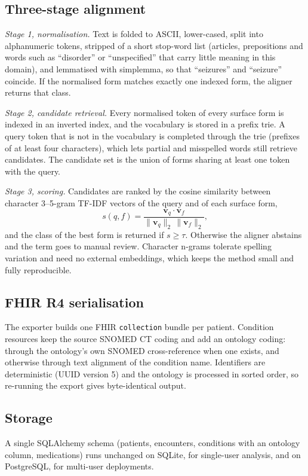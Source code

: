 \documentclass[preprint,12pt]{elsarticle}
\begin{document}
\subsection{Three-stage alignment}
\textit{Stage 1, normalisation.} Text is folded to ASCII, lower-cased, split into alphanumeric tokens, stripped of a short stop-word list (articles, prepositions and words such as ``disorder'' or ``unspecified'' that carry little meaning in this domain), and lemmatised with simplemma, so that ``seizures'' and ``seizure'' coincide. If the normalised form matches exactly one indexed form, the aligner returns that class.

\textit{Stage 2, candidate retrieval.} Every normalised token of every surface form is indexed in an inverted index, and the vocabulary is stored in a prefix trie. A query token that is not in the vocabulary is completed through the trie (prefixes of at least four characters), which lets partial and misspelled words still retrieve candidates. The candidate set is the union of forms sharing at least one token with the query.

\textit{Stage 3, scoring.} Candidates are ranked by the cosine similarity between character 3--5-gram TF-IDF vectors of the query and of each surface form,
\begin{equation}
s(q,f)=\frac{\mathbf{v}_q\cdot\mathbf{v}_f}{\lVert\mathbf{v}_q\rVert_2\,\lVert\mathbf{v}_f\rVert_2},
\end{equation}
and the class of the best form is returned if $s\ge\tau$. Otherwise the aligner abstains and the term goes to manual review. Character n-grams tolerate spelling variation and need no external embeddings, which keeps the method small and fully reproducible.

\subsection{FHIR R4 serialisation}
The exporter builds one FHIR \texttt{collection} bundle per patient. Condition resources keep the source SNOMED CT coding and add an ontology coding: through the ontology's own SNOMED cross-reference when one exists, and otherwise through text alignment of the condition name. Identifiers are deterministic (UUID version 5) and the ontology is processed in sorted order, so re-running the export gives byte-identical output.

\subsection{Storage}
A single SQLAlchemy schema (patients, encounters, conditions with an ontology column, medications) runs unchanged on SQLite, for single-user analysis, and on PostgreSQL, for multi-user deployments.
\end{document}
